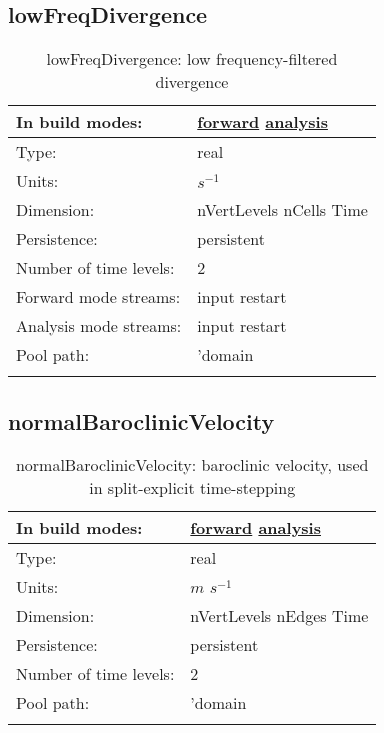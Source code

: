 \subsection[lowFreqDivergence]{lowFreqDivergence}
\label{subsec:var_sec_state_lowFreqDivergence}
\begin{center}
\begin{longtable}{| p{2.0in} | p{4.0in} |}
        \hline 
        In build modes: & \hyperref[subsec:forward_var_tab_state]{forward} \hyperref[subsec:analysis_var_tab_state]{analysis} \\
        \hline 
        Type: & real \\
        \hline 
        Units: & $s^{-1}$ \\
        \hline 
        Dimension: & nVertLevels nCells Time \\
        \hline 
        Persistence: & persistent \\
        \hline 
        Number of time levels: & 2 \\
        \hline 
		 Forward mode streams: &  input restart \\
        \hline 
		 Analysis mode streams: &  input restart \\
        \hline 
            Pool path: & 'domain %
 \\
		 \hline 
    \caption{lowFreqDivergence: low frequency-filtered divergence}
\end{longtable}
\end{center}
\subsection[normalBaroclinicVelocity]{normalBaroclinicVelocity}
\label{subsec:var_sec_state_normalBaroclinicVelocity}
\begin{center}
\begin{longtable}{| p{2.0in} | p{4.0in} |}
        \hline 
        In build modes: & \hyperref[subsec:forward_var_tab_state]{forward} \hyperref[subsec:analysis_var_tab_state]{analysis} \\
        \hline 
        Type: & real \\
        \hline 
        Units: & $m$ $s^{-1}$ \\
        \hline 
        Dimension: & nVertLevels nEdges Time \\
        \hline 
        Persistence: & persistent \\
        \hline 
        Number of time levels: & 2 \\
        \hline 
            Pool path: & 'domain %
 \\
		 \hline 
    \caption{normalBaroclinicVelocity: baroclinic velocity, used in split-explicit time-stepping}
\end{longtable}
\end{center}
